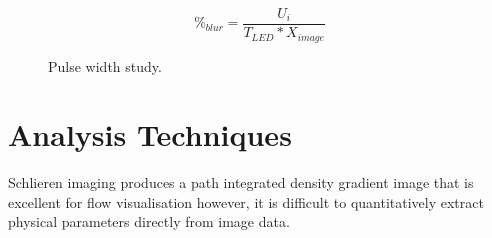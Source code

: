\begin{equation} \label{eqn:blur}
\%_{blur} = \frac{U_i}{T_{LED}*X_{image}}
\end{equation}
\begin{figure}[H]
  \centering
  \hfill
  \caption{Pulse width study.}
  \label{fig:pulse}
\end{figure}



\newpage

\section{Analysis Techniques} \label{sect:post}

Schlieren imaging produces a path integrated density gradient image that is excellent for flow visualisation however, it is difficult to quantitatively extract physical parameters directly from image data. 

